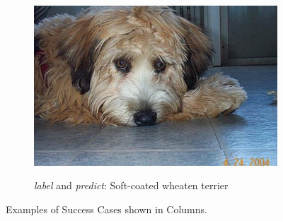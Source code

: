 \documentclass{article}
\begin{document}
\begin{figure}[h]
\begin{subfigure}{0.32\linewidth}
		\includegraphics[width=\linewidth]{pics/success_soft}
		\caption{}
		\emph{label} and \emph{predict}: Soft-coated wheaten terrier
		\label{fig:success_soft}
	\end{subfigure} 
	
	\caption{Examples of Success Cases shown in Columns.}
\end{figure}
\end{document}

